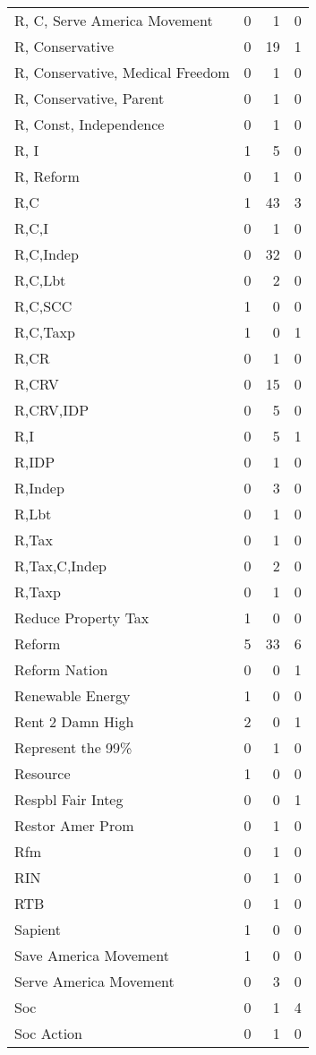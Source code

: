 \begin{supertabular}{lrrr}
R, C, Serve America Movement & 0 & 1 & 0\\
R, Conservative & 0 & 19 & 1\\
R, Conservative, Medical Freedom & 0 & 1 & 0\\
R, Conservative, Parent & 0 & 1 & 0\\
R, Const, Independence & 0 & 1 & 0\\
R, I & 1 & 5 & 0\\
R, Reform & 0 & 1 & 0\\
R,C & 1 & 43 & 3\\
R,C,I & 0 & 1 & 0\\
R,C,Indep & 0 & 32 & 0\\
R,C,Lbt & 0 & 2 & 0\\
R,C,SCC & 1 & 0 & 0\\
R,C,Taxp & 1 & 0 & 1\\
R,CR & 0 & 1 & 0\\
R,CRV & 0 & 15 & 0\\
R,CRV,IDP & 0 & 5 & 0\\
R,I & 0 & 5 & 1\\
R,IDP & 0 & 1 & 0\\
R,Indep & 0 & 3 & 0\\
R,Lbt & 0 & 1 & 0\\
R,Tax & 0 & 1 & 0\\
R,Tax,C,Indep & 0 & 2 & 0\\
R,Taxp & 0 & 1 & 0\\
Reduce Property Tax & 1 & 0 & 0\\
Reform & 5 & 33 & 6\\
Reform Nation & 0 & 0 & 1\\
Renewable Energy & 1 & 0 & 0\\
Rent 2 Damn High & 2 & 0 & 1\\
Represent the 99\% & 0 & 1 & 0\\
Resource & 1 & 0 & 0\\
Respbl Fair Integ & 0 & 0 & 1\\
Restor Amer Prom & 0 & 1 & 0\\
Rfm & 0 & 1 & 0\\
RIN & 0 & 1 & 0\\
RTB & 0 & 1 & 0\\
Sapient & 1 & 0 & 0\\
Save America Movement & 1 & 0 & 0\\
Serve America Movement & 0 & 3 & 0\\
Soc & 0 & 1 & 4\\
Soc Action & 0 & 1 & 0\\

\end{supertabular}
